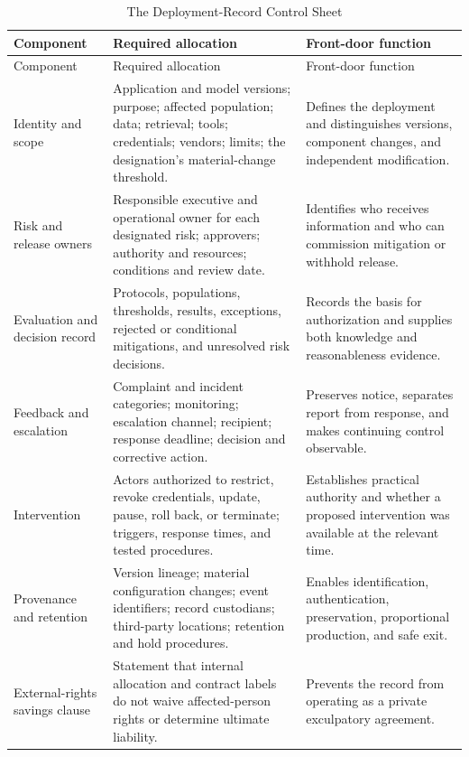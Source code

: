 \begin{longtable}{>{\raggedright\arraybackslash}p{} >{\raggedright\arraybackslash}p{} >{\raggedright\arraybackslash}p{}}
\caption{The Deployment-Record Control Sheet}\label{tab:control-sheet}\\
\toprule
Component & Required allocation & Front-door function \\
\midrule
\endfirsthead
\toprule
Component & Required allocation & Front-door function \\
\midrule
\endhead
Identity and scope & Application and model versions; purpose; affected population; data; retrieval; tools; credentials; vendors; limits; the designation's material-change threshold. & Defines the deployment and distinguishes versions, component changes, and independent modification. \\
Risk and release owners & Responsible executive and operational owner for each designated risk; approvers; authority and resources; conditions and review date. & Identifies who receives information and who can commission mitigation or withhold release. \\
Evaluation and decision record & Protocols, populations, thresholds, results, exceptions, rejected or conditional mitigations, and unresolved risk decisions. & Records the basis for authorization and supplies both knowledge and reasonableness evidence. \\
Feedback and escalation & Complaint and incident categories; monitoring; escalation channel; recipient; response deadline; decision and corrective action. & Preserves notice, separates report from response, and makes continuing control observable. \\
Intervention & Actors authorized to restrict, revoke credentials, update, pause, roll back, or terminate; triggers, response times, and tested procedures. & Establishes practical authority and whether a proposed intervention was available at the relevant time. \\
Provenance and retention & Version lineage; material configuration changes; event identifiers; record custodians; third-party locations; retention and hold procedures. & Enables identification, authentication, preservation, proportional production, and safe exit. \\
External-rights savings clause & Statement that internal allocation and contract labels do not waive affected-person rights or determine ultimate liability. & Prevents the record from operating as a private exculpatory agreement. \\
\bottomrule
\end{longtable}

